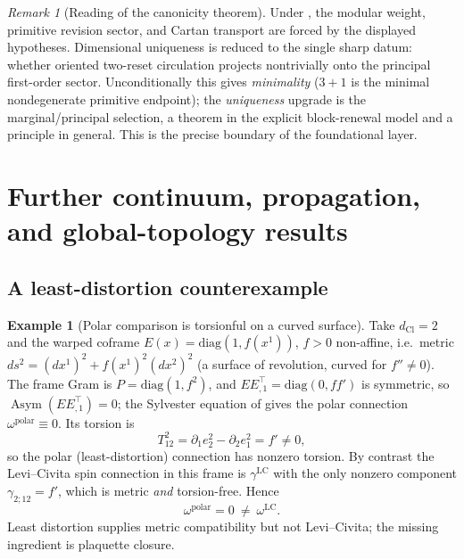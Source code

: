 \documentclass[11pt]{article}
\theoremstyle{definition}
\newtheorem{example}[theorem]{Example}
\theoremstyle{remark}
\newtheorem{remark}[theorem]{Remark}
\newcommand{\dCl}{d_{\mathrm{Cl}}}
\newcommand{\Asym}{\operatorname{Asym}}
\begin{document}
\begin{remark}[Reading of the canonicity theorem]
\label{rem:canonicity-reading}
Under , the modular weight, primitive revision sector, and
Cartan transport are forced by the displayed hypotheses.  Dimensional uniqueness
is reduced to the single sharp datum: whether oriented two-reset circulation projects nontrivially onto
the principal first-order sector.  Unconditionally this gives \emph{minimality}
($3+1$ is the minimal nondegenerate primitive endpoint); the \emph{uniqueness}
upgrade is the marginal/principal selection, a theorem in the explicit
block-renewal model and a principle in general.  This is the precise boundary of
the foundational layer.
\end{remark}





\section{Further continuum, propagation, and global-topology results}
\label{app:further-continuum}

\subsection{A least-distortion counterexample}

\begin{example}[Polar comparison is torsionful on a curved surface]
\label{ex:polar-not-LC}
Take $\dCl=2$ and the warped coframe $E(x)=\mathrm{diag}(1,f(x^1))$,
$f>0$ non-affine, i.e.\ metric $ds^2=(dx^1)^2+f(x^1)^2(dx^2)^2$ (a surface of
revolution, curved for $f''\neq0$).  The frame Gram is $P=\mathrm{diag}(1,f^2)$,
and $E E_{,1}^\top=\mathrm{diag}(0,ff')$ is symmetric, so $\Asym(EE_{,1}^\top)=0$;
the Sylvester equation of  gives the polar connection
$\omega^{\mathrm{polar}}\equiv0$.  Its torsion is
\[
  T^2_{12}=\partial_1 e^2_2-\partial_2 e^2_1=f'\neq0 ,
\]
so the polar (least-distortion) connection has nonzero torsion.  By contrast the
Levi--Civita spin connection in this frame is $\gamma^{\mathrm{LC}}$ with the only
nonzero component $\gamma_{2;12}=f'$, which is metric \emph{and} torsion-free.
Hence
\[
  \omega^{\mathrm{polar}}=0\ \neq\ \omega^{\mathrm{LC}} .
\]
Least distortion supplies metric compatibility but not Levi--Civita; the missing
ingredient is plaquette closure.
\end{example}
\end{document}
